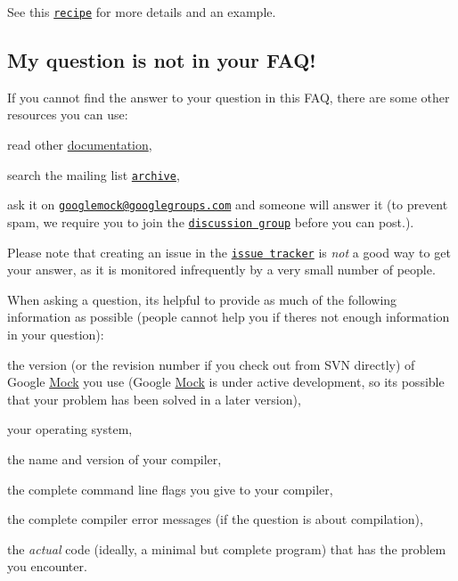 See this \href{CookBook.md#mocking_side_effects}{\tt recipe} for more details and an example.

\subsection*{My question is not in your F\+A\+Q!}

If you cannot find the answer to your question in this F\+AQ, there are some other resources you can use\+:


\begin{DoxyEnumerate}
\item read other \hyperlink{googletest_2docs_2_documentation_8md}{documentation},
\end{DoxyEnumerate}
\begin{DoxyEnumerate}
\item search the mailing list \href{http://groups.google.com/group/googlemock/topics}{\tt archive},
\end{DoxyEnumerate}
\begin{DoxyEnumerate}
\item ask it on \href{mailto:googlemock@googlegroups.com}{\tt googlemock@googlegroups.\+com} and someone will answer it (to prevent spam, we require you to join the \href{http://groups.google.com/group/googlemock}{\tt discussion group} before you can post.).
\end{DoxyEnumerate}

Please note that creating an issue in the \href{https://github.com/google/googletest/issues}{\tt issue tracker} is {\itshape not} a good way to get your answer, as it is monitored infrequently by a very small number of people.

When asking a question, it\textquotesingle{}s helpful to provide as much of the following information as possible (people cannot help you if there\textquotesingle{}s not enough information in your question)\+:


\begin{DoxyItemize}
\item the version (or the revision number if you check out from S\+VN directly) of Google \hyperlink{class_mock}{Mock} you use (Google \hyperlink{class_mock}{Mock} is under active development, so it\textquotesingle{}s possible that your problem has been solved in a later version),
\item your operating system,
\item the name and version of your compiler,
\item the complete command line flags you give to your compiler,
\item the complete compiler error messages (if the question is about compilation),
\item the {\itshape actual} code (ideally, a minimal but complete program) that has the problem you encounter. 
\end{DoxyItemize}